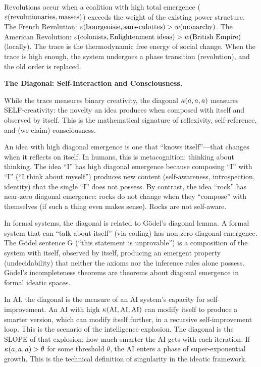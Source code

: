 \begin{interpretation}
Revolutions occur when a coalition with high total emergence ($\varepsilon(\text{revolutionaries}, \text{masses})$)
exceeds the weight of the existing power structure. The French Revolution:
$\varepsilon(\text{bourgeoisie}, \text{sans-culottes}) > w(\text{monarchy})$.
The American Revolution: $\varepsilon(\text{colonists}, \text{Enlightenment ideas}) > w(\text{British Empire})$ (locally).
The trace is the thermodynamic free energy of social change. When the trace is
high enough, the system undergoes a phase transition (revolution), and the old
order is replaced.

\textbf{The Diagonal: Self-Interaction and Consciousness.}

While the trace measures binary creativity, the diagonal $\kappa(a,a,a)$ measures
SELF-creativity: the novelty an idea produces when composed with itself and
observed by itself. This is the mathematical signature of reflexivity,
self-reference, and (we claim) consciousness.

An idea with high diagonal emergence is one that ``knows itself''---that changes
when it reflects on itself. In humans, this is metacognition: thinking about
thinking. The idea ``I'' has high diagonal emergence because composing ``I''
with ``I'' (``I think about myself'') produces new content (self-awareness,
introspection, identity) that the single ``I'' does not possess. By contrast,
the idea ``rock'' has near-zero diagonal emergence: rocks do not change when
they ``compose'' with themselves (if such a thing even makes sense). Rocks are
not self-aware.

In formal systems, the diagonal is related to Gödel's diagonal lemma. A formal
system that can ``talk about itself'' (via coding) has non-zero diagonal emergence.
The Gödel sentence G (``this statement is unprovable'') is a composition of the
system with itself, observed by itself, producing an emergent property (undecidability)
that neither the axioms nor the inference rules alone possess. Gödel's incompleteness
theorems are theorems about diagonal emergence in formal ideatic spaces.

In AI, the diagonal is the measure of an AI system's capacity for self-improvement.
An AI with high $\kappa(\text{AI}, \text{AI}, \text{AI})$ can modify itself
to produce a smarter version, which can modify itself further, in a recursive
self-improvement loop. This is the scenario of the intelligence explosion. The
diagonal is the SLOPE of that explosion: how much smarter the AI gets with each
iteration. If $\kappa(a,a,a) > \theta$ for some threshold $\theta$, the AI
enters a phase of super-exponential growth. This is the technical definition of
singularity in the ideatic framework.
\end{interpretation}


